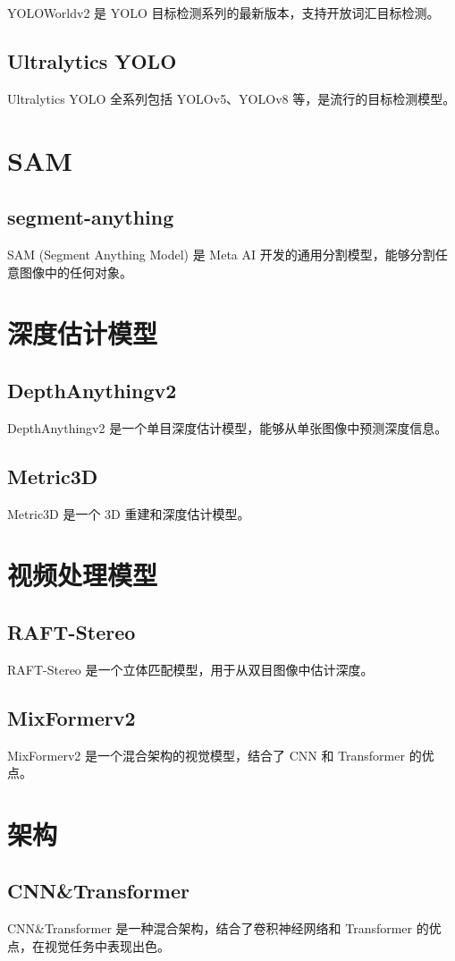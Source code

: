\documentclass[12pt,UTF8]{ctexbook}
\begin{document}
YOLOWorldv2 是 YOLO 目标检测系列的最新版本，支持开放词汇目标检测。

\subsection{Ultralytics YOLO}

Ultralytics YOLO 全系列包括 YOLOv5、YOLOv8 等，是流行的目标检测模型。

\section{SAM}

\subsection{segment-anything}

SAM (Segment Anything Model) 是 Meta AI 开发的通用分割模型，能够分割任意图像中的任何对象。

\section{深度估计模型}

\subsection{DepthAnythingv2}

DepthAnythingv2 是一个单目深度估计模型，能够从单张图像中预测深度信息。

\subsection{Metric3D}

Metric3D 是一个 3D 重建和深度估计模型。

\section{视频处理模型}

\subsection{RAFT-Stereo}

RAFT-Stereo 是一个立体匹配模型，用于从双目图像中估计深度。

\subsection{MixFormerv2}

MixFormerv2 是一个混合架构的视觉模型，结合了 CNN 和 Transformer 的优点。

\section{架构}

\subsection{CNN\&Transformer}

CNN\&Transformer 是一种混合架构，结合了卷积神经网络和 Transformer 的优点，在视觉任务中表现出色。

\backmatter
\end{document}
